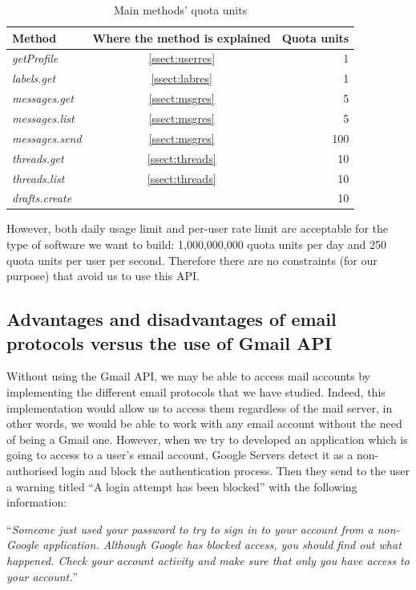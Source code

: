 \begin{table}[h]
	\centering
	\begin{tabular}{|l c r|}
		\hline
		\textbf{Method} & \textbf{Where the method is explained} & \textbf{Quota units} \\
		\hline\hline
		\textit{getProfile} & \ref{ssect:userres} & 1\\ \hline
		\textit{labels.get} & \ref{ssect:labres} & 1\\ \hline
		\textit{messages.get} & \ref{ssect:msgres} & 5\\ \hline
		\textit{messages.list} & \ref{ssect:msgres} & 5\\ \hline
		\textit{messages.send} & \ref{ssect:msgres} & 100\\ \hline
		\textit{threads.get} & \ref{ssect:threads} & 10\\ \hline
		\textit{threads.list} & \ref{ssect:threads} & 10\\ \hline
		\textit{drafts.create} & \citep[/v1/reference/users/drafts]{gmailAPI} & 10\\ \hline
	\end{tabular}
	\caption{Main methods' quota units}
	\label{tab:quotaUnits}
\end{table}

However, both daily usage limit and per-user rate limit are acceptable for the type of software we want to build: 1,000,000,000 quota units per day and 250 quota units per user per second. Therefore there are no constraints (for our purpose) that avoid us to use this API.

\subsection{Advantages and disadvantages of email protocols versus the use of Gmail API} \label{ssect:protvsapi}
Without using the Gmail API, we may be able to access mail accounts by implementing the different email protocols that we have studied. Indeed, this implementation would allow us to access them regardless of the mail server, in other words, we would be able to work with any email account without the need of being a Gmail one. However, when we try to developed an application which is going to access to a user's email account, Google Servers detect it as a non-authorised login and block the authentication process. Then they send to the user a warning titled ``A login attempt has been blocked'' with the following information:

``\textit{Someone just used your password to try to sign in to your account from a non-Google application. Although Google has blocked access, you should find out what happened. Check your account activity and make sure that only you have access to your account.}''

